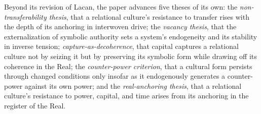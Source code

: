 Beyond its revision of Lacan, the paper advances five theses of its own: the \emph{non-transferability thesis}, that a relational culture's resistance to transfer rises with the depth of its anchoring in interwoven drive; the \emph{vacancy thesis}, that the externalization of symbolic authority sets a system's endogeneity and its stability in inverse tension; \emph{capture-as-decoherence}, that capital captures a relational culture not by seizing it but by preserving its symbolic form while drawing off its coherence in the Real; the \emph{counter-power criterion}, that a cultural form persists through changed conditions only insofar as it endogenously generates a counter-power against its own power; and the \emph{real-anchoring thesis}, that a relational culture's resistance to power, capital, and time arises from its anchoring in the register of the Real.
